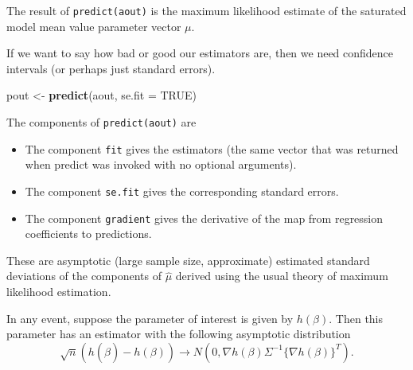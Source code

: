\documentclass[
  ignorenonframetext,
]{beamer}
\newenvironment{Shaded}{\begin{snugshade}}{\end{snugshade}}
\newcommand{\AttributeTok}[1]{\textcolor[rgb]{0.13,0.29,0.53}{#1}}
\newcommand{\ConstantTok}[1]{\textcolor[rgb]{0.56,0.35,0.01}{#1}}
\newcommand{\FunctionTok}[1]{\textcolor[rgb]{0.13,0.29,0.53}{\textbf{#1}}}
\newcommand{\NormalTok}[1]{#1}
\newcommand{\OtherTok}[1]{\textcolor[rgb]{0.56,0.35,0.01}{#1}}
\begin{document}
\begin{frame}[fragile]{}
\protect\hypertarget{section-27}{}
The result of \texttt{predict(aout)} is the maximum likelihood estimate
of the saturated model mean value parameter vector \(\mu\).

If we want to say how bad or good our estimators are, then we need
confidence intervals (or perhaps just standard errors).

\vspace{12pt}
\tiny

\begin{Shaded}
\begin{Highlighting}[]
\NormalTok{pout }\OtherTok{\textless{}{-}} \FunctionTok{predict}\NormalTok{(aout, }\AttributeTok{se.fit =} \ConstantTok{TRUE}\NormalTok{)}
\end{Highlighting}
\end{Shaded}

\vspace{12pt}
\normalsize

The components of \texttt{predict(aout)} are

\begin{itemize}
  \item The component \texttt{fit} gives the estimators (the same vector that was returned when predict was invoked with no optional arguments).
  \item The component \texttt{se.fit} gives the corresponding standard errors.
  \item The component \texttt{gradient} gives the derivative of the map from regression coefficients to predictions.
\end{itemize}
\end{frame}

\begin{frame}{}
\protect\hypertarget{section-28}{}
These are asymptotic (large sample size, approximate) estimated standard
deviations of the components of \(\hat\mu\) derived using the usual
theory of maximum likelihood estimation.

In any event, suppose the parameter of interest is given by
\(h(\beta)\). Then this parameter has an estimator with the following
asymptotic distribution \[
  \sqrt{n}(h(\hat\beta) - h(\beta)) \to N\left(0, \nabla h(\beta)\Sigma^{-1} \{\nabla h(\beta)\}^T \right).
\]
\end{frame}
\end{document}

